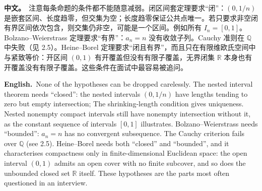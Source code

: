 \documentclass[UTF8,11pt,a4paper]{ctexart}
\newcommand{\BOTH}[2]{\par\noindent\textbf{中文。}\ #1\par\noindent\textbf{English.}\ #2\par}
\begin{document}
\BOTH{注意每条命题的条件都不能随意减弱。闭区间套定理要求“闭”：$(0,1/n)$ 是嵌套区间、长度趋零，但交集为空；长度趋零保证公共点唯一。若只要求非空闭有界区间依次包含，则交集仍非空，可能是一个区间。例如所有 $I_n=[0,1]$。Bolzano--Weierstrass 定理要求“有界”：$a_n=n$ 没有收敛子列。Cauchy 准则在 $\mathbb Q$ 中失败（见 2.5）。Heine--Borel 定理要求“闭且有界”，而且只在有限维欧氏空间中与紧致等价：开区间 $(0,1)$ 有开覆盖但没有有限子覆盖，无界闭集 $\mathbb R$ 本身也有开覆盖没有有限子覆盖。这些条件在面试中最容易被追问。}{None of the hypotheses can be dropped carelessly. The nested interval theorem needs “closed”: the nested intervals $(0,1/n)$ have lengths tending to zero but empty intersection; The shrinking-length condition gives uniqueness. Nested nonempty compact intervals still have nonempty intersection without it, as the constant sequence of intervals $[0,1]$ illustrates. Bolzano--Weierstrass needs “bounded”: $a_n=n$ has no convergent subsequence. The Cauchy criterion fails over $\mathbb Q$ (see 2.5). Heine--Borel needs both “closed” and “bounded”, and it characterises compactness only in finite-dimensional Euclidean space: the open interval $(0,1)$ admits an open cover with no finite subcover, and so does the unbounded closed set $\mathbb R$ itself. These hypotheses are the parts most often questioned in an interview.}
\end{document}
